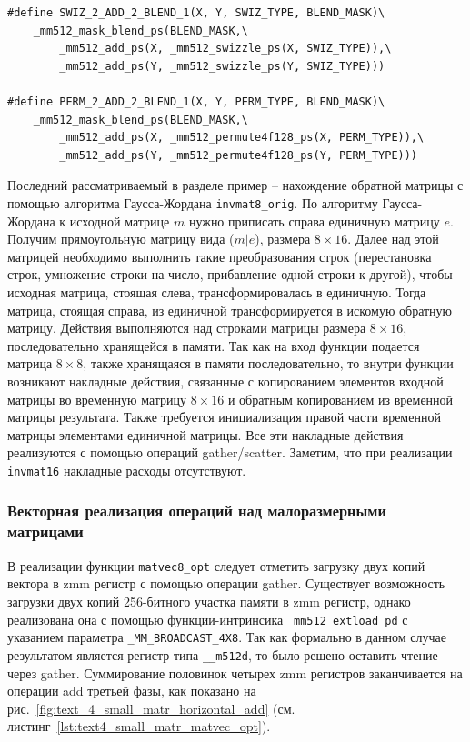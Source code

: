 \begin{singlespace}
\begin{lstlisting}[caption={Определение макросов для реализации фаз суммирования элементов векторов.}, label={lst:text_4_small_matr_swiz_macro}]
#define SWIZ_2_ADD_2_BLEND_1(X, Y, SWIZ_TYPE, BLEND_MASK)\
    _mm512_mask_blend_ps(BLEND_MASK,\
        _mm512_add_ps(X, _mm512_swizzle_ps(X, SWIZ_TYPE)),\
        _mm512_add_ps(Y, _mm512_swizzle_ps(Y, SWIZ_TYPE)))

#define PERM_2_ADD_2_BLEND_1(X, Y, PERM_TYPE, BLEND_MASK)\
    _mm512_mask_blend_ps(BLEND_MASK,\
        _mm512_add_ps(X, _mm512_permute4f128_ps(X, PERM_TYPE)),\
        _mm512_add_ps(Y, _mm512_permute4f128_ps(Y, PERM_TYPE)))
\end{lstlisting}
\end{singlespace}

Последний рассматриваемый в разделе пример -- нахождение обратной матрицы с помощью алгоритма Гаусса-Жордана \texttt{invmat8\_orig}.
По алгоритму Гаусса-Жордана к исходной матрице $m$ нужно приписать справа единичную матрицу $e$.
Получим прямоугольную матрицу вида ($m|e$), размера $8 \times 16$.
Далее над этой матрицей необходимо выполнить такие преобразования строк (перестановка строк, умножение строки на число, прибавление одной строки к другой), чтобы исходная матрица, стоящая слева, трансформировалась в единичную.
Тогда матрица, стоящая справа, из единичной трансформируется в искомую обратную матрицу.
Действия выполняются над строками матрицы размера $8 \times 16$, последовательно хранящейся в памяти.
Так как на вход функции подается матрица $8 \times 8$, также хранящаяся в памяти последовательно, то внутри функции возникают накладные действия, связанные с копированием элементов входной матрицы во временную матрицу $8 \times 16$ и обратным копированием из временной матрицы результата.
Также требуется инициализация правой части временной матрицы элементами единичной матрицы.
Все эти накладные действия реализуются с помощью операций gather/scatter.
Заметим, что при реализации \texttt{invmat16} накладные расходы отсутствуют.

\subsubsection{Векторная реализация операций над малоразмерными \mbox{матрицами}}\label{sec:text_4_small_matr_realization}

В реализации функции \texttt{matvec8\_opt} следует отметить загрузку двух копий вектора в zmm регистр с помощью операции gather.
Существует возможность загрузки двух копий 256-битного участка памяти в zmm регистр, однако реализована она с помощью функции-интринсика \texttt{\_mm512\_extload\_pd} с указанием параметра \texttt{\_MM\_BROADCAST\_4X8}.
Так как формально в данном случае результатом является регистр типа \texttt{\_\_m512d}, то было решено оставить чтение через gather.
Суммирование половинок четырех zmm регистров заканчивается на операции add третьей фазы, как показано на рис.~\ref{fig:text_4_small_matr_horizontal_add} (см. листинг~\ref{lst:text4_small_matr_matvec_opt}).

